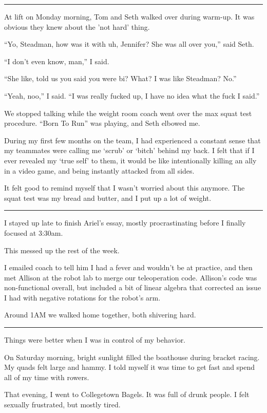 \plainfancybreak{12pt}{2}{}

At lift on Monday morning, Tom and Seth walked over during warm-up.  It was
obvious they knew about the 'not hard' thing.  

``Yo, Steadman, how was it with uh, Jennifer?  She was all over you,'' said
Seth.

``I don't even know, man,'' I said.

``She like, told us you said you were bi?  What?  I was like Steadman?
No.''

``Yeah, noo,'' I said. ``I was really fucked up, I have no idea what the fuck I
said.''

We stopped talking while the weight room coach went over the max squat test
procedure.  ``Born To Run'' was playing, and Seth elbowed me.

During my first few months on the team, I had experienced a constant sense that
my teammates were calling me `scrub' or `bitch' behind my back.  I felt that if
I ever revealed my `true self' to them, it would be like intentionally killing
an ally in a video game, and being instantly attacked from all sides.

It felt good to remind myself that I wasn't worried about this anymore.  The
squat test was my bread and butter, and I put up a lot of weight.

\plainfancybreak{12pt}{2}{}

I stayed up late to finish Ariel's essay, mostly procrastinating before I
finally focused at 3:30am.

This messed up the rest of the week.

I emailed coach to tell him I had a fever and wouldn't be at practice, and then
met Allison at the robot lab to merge our teleoperation code.   Allison's code
was non-functional overall, but included a bit of linear algebra that corrected
an issue I had with negative rotations for the robot's arm.

Around 1AM we walked home together, both shivering hard. 

\plainfancybreak{12pt}{2}{}

Things were better when I was in control of my behavior.  

On Saturday morning, bright sunlight filled the boathouse during bracket racing.
My quads felt large and hammy.  I told myself it was time to get fast and spend
all of my time with rowers.

That evening, I went to Collegetown Bagels.  It was full of drunk people.  I
felt sexually frustrated, but mostly tired.  

